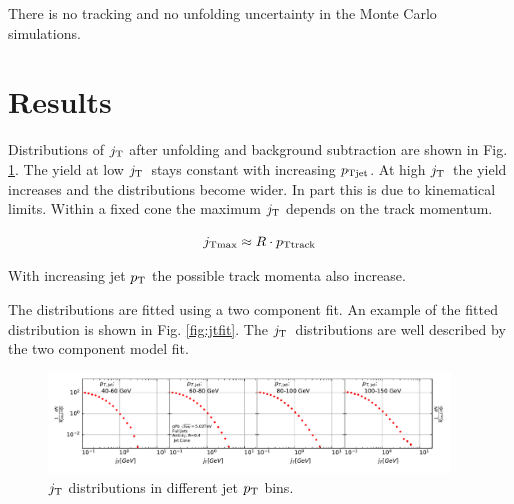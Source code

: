 There is no tracking and no unfolding uncertainty in the Monte Carlo simulations. 


%
%


\section{Results}
\label{sec:results}

Distributions of $j_{\rm T}$ after unfolding and background subtraction are shown in Fig. \ref{fig:jtdist}. The yield at low $j_{\rm T}$ stays constant with increasing $p_{\rm Tjet}$. At high $j_{\rm T}$ the yield increases and the distributions become wider. In part this is due to kinematical limits. Within a fixed cone the maximum $j_{\rm T}$ depends on the track momentum. 

$$j_{\rm Tmax} \approx R \cdot p_{\rm Ttrack}$$

With increasing jet $p_{\rm T}$ the possible track momenta also increase.

The distributions are fitted using a two component fit. An example of the fitted distribution is shown in Fig. \ref{fig:jtfit}. The $j_{\rm T}$ distributions are well described by the two component model fit. 

\begin{figure}[htb]
\begin{center}
\includegraphics[width=0.95\textwidth]{figures/results/MixedFullJetsR04JetConeJtSignalPtFrom4To8.pdf}
\caption{$j_{\rm T}$ distributions in different jet $p_{\rm T}$ bins.}
\label{fig:jtdist}
\end{center}
\end{figure}

